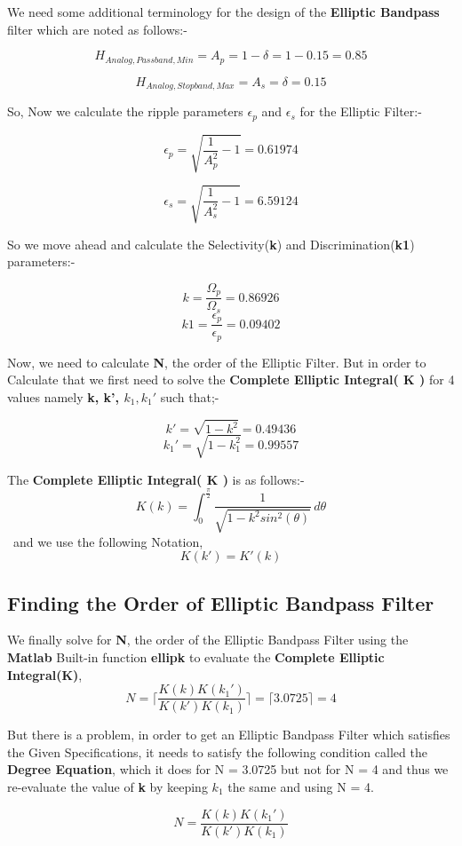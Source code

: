 \documentclass[12pt]{article}
\begin{document}
We need some additional terminology for the design of the \textbf{Elliptic Bandpass} filter which are noted as follows:- 

\[H_{Analog,Passband,Min} = A_{p} = 1 - \delta = 1 - 0.15 = 0.85\]

\[H_{Analog,Stopband,Max} = A_{s} = \delta = 0.15\]

So, Now we calculate the ripple parameters $\epsilon_{p}$ and $\epsilon_{s}$ for the Elliptic Filter:-

\[\epsilon_{p} = \sqrt{\frac{1}{A_{p}^2} - 1} = 0.61974\]

\[\epsilon_{s} = \sqrt{\frac{1}{A_{s}^2} - 1} = 6.59124\]

So we move ahead and calculate the Selectivity(\textbf{k}) and Discrimination(\textbf{k1}) parameters:-

\[k = \frac{\Omega_{p}}{\Omega_{s}} = 0.86926\]
\[k1 = \frac{\epsilon_{p}}{\epsilon_{p}} = 0.09402\]

Now, we need to calculate \textbf{N}, the order of the Elliptic Filter. But in order to Calculate that we first need to solve the \textbf{Complete Elliptic Integral( K )} for 4 values namely \textbf{k, k', $k_{1}, k_{1}'$}
such that;-

\[k' = \sqrt{1 - k^{2}} = 0.49436\]
\[k_{1}' = \sqrt{1 - k_{1}^{2}} = 0.99557\]

The \textbf{Complete Elliptic Integral( K )} is as follows:-
\[K(k) = \int_{0}^{\frac{\pi}{2}} \frac{1}{\sqrt{1 - k^{2}sin^{2}(\theta)}} \, d\theta \]\
and we use the following Notation,
\[K(k') = K'(k)\]

\subsection{Finding the Order of Elliptic Bandpass Filter}

We finally solve for \textbf{N}, the order of the Elliptic Bandpass Filter using the \textbf{Matlab} Built-in function \textbf{ellipk} to evaluate the \textbf{Complete Elliptic Integral(K)},
\[N = \lceil {\frac{K(k)K(k_{1}')}{K(k')K(k_{1})}} \rceil = \lceil 3.0725 \rceil = 4\]

But there is a problem, in order to get an Elliptic Bandpass Filter which satisfies the Given Specifications, it needs to satisfy the following condition called the \textbf{Degree Equation}, which it does for N = 3.0725 but not for N = 4 and thus we re-evaluate the value of \textbf{k} by keeping $k_{1}$ the same and using N = 4.

\[N = \frac{K(k)K(k_{1}')}{K(k')K(k_{1})}\]
\end{document}
